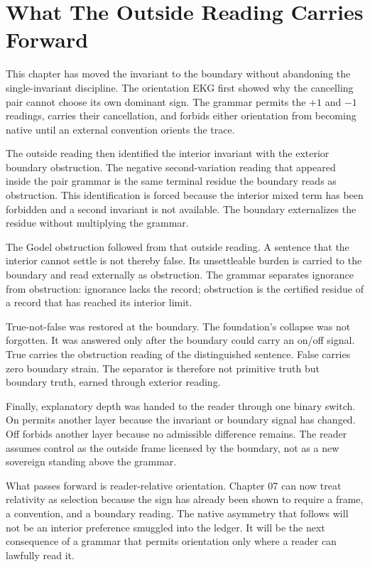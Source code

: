 \section{What The Outside Reading Carries Forward}

This chapter has moved the invariant to the boundary without abandoning the
single-invariant discipline. The orientation EKG first showed why the
cancelling pair cannot choose its own dominant sign. The grammar permits the
\(+1\) and \(-1\) readings, carries their cancellation, and forbids either
orientation from becoming native until an external convention orients the
trace.

The outside reading then identified the interior invariant with the exterior
boundary obstruction. The negative second-variation reading that appeared
inside the pair grammar is the same terminal residue the boundary reads as
obstruction. This identification is forced because the interior mixed term
has been forbidden and a second invariant is not available. The boundary
externalizes the residue without multiplying the grammar.

The Godel obstruction followed from that outside reading. A sentence that the
interior cannot settle is not thereby false. Its unsettleable burden is
carried to the boundary and read externally as obstruction. The grammar
separates ignorance from obstruction: ignorance lacks the record; obstruction
is the certified residue of a record that has reached its interior limit.

True-not-false was restored at the boundary. The foundation's collapse was
not forgotten. It was answered only after the boundary could carry an on/off
signal. True carries the obstruction reading of the distinguished sentence.
False carries zero boundary strain. The separator is therefore not primitive
truth but boundary truth, earned through exterior reading.

Finally, explanatory depth was handed to the reader through one binary
switch. On permits another layer because the invariant or boundary signal has
changed. Off forbids another layer because no admissible difference remains.
The reader assumes control as the outside frame licensed by the boundary, not
as a new sovereign standing above the grammar.

What passes forward is reader-relative orientation. Chapter 07 can now treat
relativity as selection because the sign has already been shown to require a
frame, a convention, and a boundary reading. The native asymmetry that follows
will not be an interior preference smuggled into the ledger. It will be the
next consequence of a grammar that permits orientation only where a reader
can lawfully read it.
